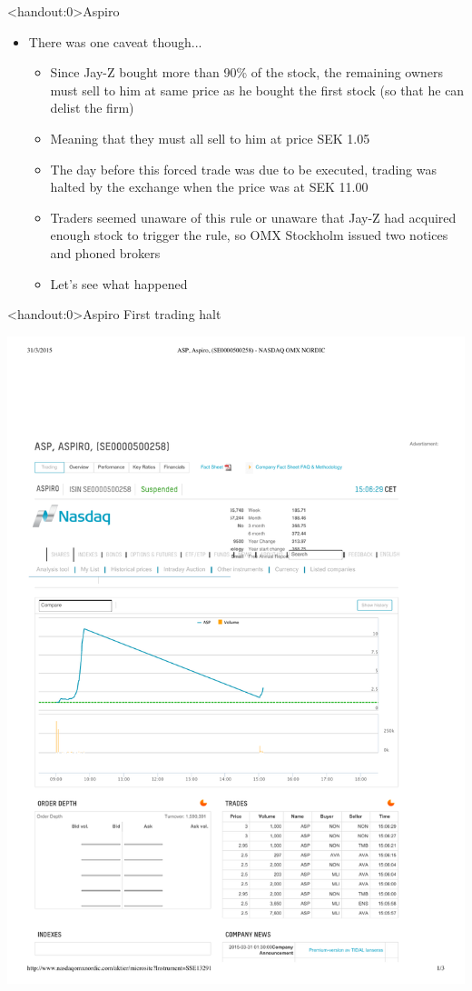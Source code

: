 \documentclass[english,10pt
,aspectratio=169
]{beamer}
\begin{document}
\begin{frame}<handout:0>{Aspiro}
	\begin{itemize}
		\item There was one caveat though...
		\begin{itemize}
			\item Since Jay-Z bought more than 90\% of the stock, the remaining owners must sell to him at same price as he bought the first stock (so that he can delist the firm)
			\item Meaning that they must all sell to him at price SEK 1.05
			\pause
			\item The day before this forced trade was due to be executed, trading was halted by the exchange when the price was at SEK 11.00
			\item Traders seemed unaware of this rule or unaware that Jay-Z had acquired enough stock to trigger the rule, so OMX Stockholm issued two notices and phoned brokers
			\item Let's see what happened
		\end{itemize}
	\end{itemize}
\end{frame}


\begin{frame}<handout:0>{Aspiro}
	First trading halt
	
	\includegraphics{pics/aspiro1}
\end{frame}
\end{document}
